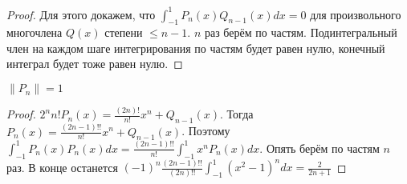 \documentclass[document.tex]{subfiles}
\begin{document}
\begin{proof}
    Для этого докажем, что $\int_{-1}^{1}P_n(x) Q_{n - 1}(x)dx = 0$ для произвольного многочлена $Q(x)$ степени $\leq n
    - 1$. $n$ раз берём по частям. Подинтегральный член на каждом шаге интегрирования по частям будет равен нулю,
    конечный интеграл будет тоже равен нулю.
\end{proof}

\begin{statement}
    $\|P_n\| = 1$
\end{statement}

\begin{proof}
    $2^{n}n!P_n(x) = \frac{(2n)!}{n!}x^n + Q_{n - 1}(x)$. Тогда $P_n(x) = \frac{(2n - 1)!!}{n!}x^n + Q_{n - 1}(x)$. 
    Поэтому $\int_{-1}^{1}P_n(x) P_n(x)dx = \frac{(2n - 1)!!}{n!}\int_{-1}^{1}x^nP_n(x)dx$. Опять берём по частям $n$
    раз. В конце останется $(-1)^n \frac{(2n - 1)!!}{(2n)!!}\int_{-1}^{1}(x^2 - 1)^n dx = \frac{2}{2n + 1}$
\end{proof}
\end{document}
